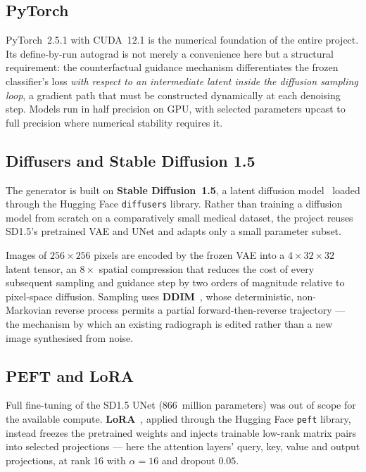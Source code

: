 \subsection{PyTorch}

PyTorch~2.5.1 with CUDA~12.1 is the numerical foundation of the entire
project. Its define-by-run autograd is not merely a convenience here but
a structural requirement: the counterfactual guidance mechanism
differentiates the frozen classifier's loss \emph{with respect to an
intermediate latent inside the diffusion sampling loop}, a gradient path
that must be constructed dynamically at each denoising step. Models run
in half precision on GPU, with selected parameters upcast to full
precision where numerical stability requires it.

\subsection{Diffusers and Stable Diffusion 1.5}

The generator is built on \textbf{Stable Diffusion~1.5}, a latent
diffusion model~\cite{rombach2022} loaded through the Hugging Face
\texttt{diffusers} library. Rather than training a diffusion model from
scratch on a comparatively small medical dataset, the project reuses
SD1.5's pretrained VAE and UNet and adapts only a small parameter subset.

Images of $256\times256$ pixels are encoded by the frozen VAE into a
$4\times32\times32$ latent tensor, an $8\times$ spatial compression that
reduces the cost of every subsequent sampling and guidance step by two
orders of magnitude relative to pixel-space diffusion. Sampling uses
\textbf{DDIM}~\cite{song2021ddim}, whose deterministic, non-Markovian
reverse process permits a partial forward-then-reverse trajectory --- the
mechanism by which an existing radiograph is edited rather than a new
image synthesised from noise.

\subsection{PEFT and LoRA}

Full fine-tuning of the SD1.5 UNet (866~million parameters) was out of
scope for the available compute. \textbf{LoRA}~\cite{hu2021lora}, applied
through the Hugging Face \texttt{peft} library, instead freezes the
pretrained weights and injects trainable low-rank matrix pairs into
selected projections --- here the attention layers' query, key, value and
output projections, at rank 16 with $\alpha=16$ and dropout $0.05$.

